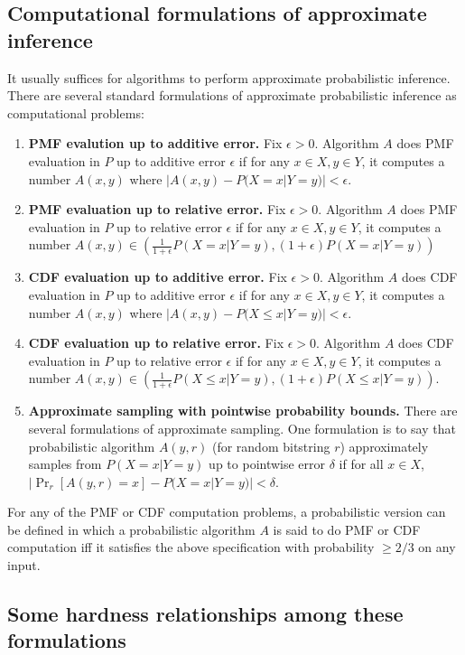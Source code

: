 \documentclass{article}
\theoremstyle{definition}
\theoremstyle{remark}
\begin{document}
\subsection{Computational formulations of approximate inference}
It usually suffices for algorithms to perform approximate probabilistic inference.
There are several standard formulations of approximate probabilistic inference as computational problems:
\begin{enumerate}
    \item \textbf{PMF evalution up to additive error.} Fix $\epsilon > 0$.  Algorithm $A$ does PMF evaluation in $P$ up to additive error $\epsilon$ if for any $x \in X, y \in Y$, it computes a number $A(x, y)$ where $|A(x, y) - P(X = x | Y = y)| < \epsilon$.
    \item \textbf{PMF evaluation up to relative error.} Fix $\epsilon > 0$.  Algorithm $A$ does PMF evaluation in $P$ up to relative error $\epsilon$ if for any $x \in X, y \in Y$, it computes a number $A(x, y) \in (\frac{1}{1 + \epsilon}P(X = x | Y = y), (1 + \epsilon)P(X = x | Y = y))$
    \item \textbf{CDF evaluation up to additive error.} Fix $\epsilon > 0$.  Algorithm $A$ does CDF evaluation in $P$ up to additive error $\epsilon$ if for any $x \in X, y \in Y$, it computes a number $A(x, y)$ where $|A(x, y) - P(X \leq x | Y = y)| < \epsilon$.
    \item \textbf{CDF evaluation up to relative error.} Fix $\epsilon > 0$.  Algorithm $A$ does CDF evaluation in $P$ up to relative error $\epsilon$ if for any $x \in X, y \in Y$, it computes a number $A(x, y) \in (\frac{1}{1 + \epsilon}P(X \leq x | Y = y), (1 + \epsilon)P(X \leq x | Y = y))$.
    \item \textbf{Approximate sampling with pointwise probability bounds.} There are several formulations of approximate sampling. One formulation is to say that probabilistic algorithm $A(y, r)$ (for random bitstring $r$) approximately samples from $P(X = x | Y = y)$ up to pointwise error $\delta$ if for all $x \in X$, $|\Pr_r[A(y, r) = x] - P(X = x | Y = y)| < \delta$.
\end{enumerate}
For any of the PMF or CDF computation problems, a probabilistic version can be defined in which a probabilistic algorithm $A$ is said to do PMF or CDF computation iff it satisfies the above specification with probability $\geq 2/3$ on any input.

\subsection{Some hardness relationships among these formulations}
\end{document}
